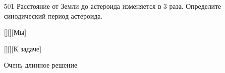 \documentclass[12pt,a4paper]{article}
\begin{document}
\begin{task}{501}
    Расстояние от Земли до астероида изменяется в 3 раза. Определите синодический период астероида.
\end{task}

[][][Мы]

[][][К задаче]


\begin{solution}
    Очень длинное решение
    

\end{solution}
\end{document}
